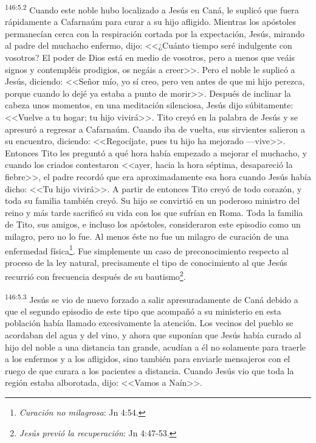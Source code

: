\par 
\textsuperscript{146:5.2} Cuando este noble hubo localizado a Jesús en Caná, le suplicó que fuera rápidamente a Cafarnaúm para curar a su hijo afligido. Mientras los apóstoles permanecían cerca con la respiración cortada por la expectación, Jesús, mirando al padre del muchacho enfermo, dijo: <<¿Cuánto tiempo seré indulgente con vosotros? El poder de Dios está en medio de vosotros, pero a menos que veáis signos y contempléis prodigios, os negáis a creer>>. Pero el noble le suplicó a Jesús, diciendo: <<Señor mío, yo sí creo, pero ven antes de que mi hijo perezca, porque cuando lo dejé ya estaba a punto de morir>>. Después de inclinar la cabeza unos momentos, en una meditación silenciosa, Jesús dijo súbitamente: <<Vuelve a tu hogar; tu hijo vivirá>>. Tito creyó en la palabra de Jesús y se apresuró a regresar a Cafarnaúm. Cuando iba de vuelta, sus sirvientes salieron a su encuentro, diciendo: <<Regocíjate, pues tu hijo ha mejorado ---vive>>. Entonces Tito les preguntó a qué hora había empezado a mejorar el muchacho, y cuando los criados contestaron <<ayer, hacia la hora séptima, desapareció la fiebre>>, el padre recordó que era aproximadamente esa hora cuando Jesús había dicho: <<Tu hijo vivirá>>. A partir de entonces Tito creyó de todo corazón, y toda su familia también creyó. Su hijo se convirtió en un poderoso ministro del reino y más tarde sacrificó su vida con los que sufrían en Roma. Toda la familia de Tito, sus amigos, e incluso los apóstoles, consideraron este episodio como un milagro, pero no lo fue. Al menos éste no fue un milagro de curación de una enfermedad física\footnote{\textit{Curación no milagrosa}: Jn 4:54.}. Fue simplemente un caso de preconocimiento respecto al proceso de la ley natural, precisamente el tipo de conocimiento al que Jesús recurrió con frecuencia después de su bautismo\footnote{\textit{Jesús previó la recuperación}: Jn 4:47-53.}.

\par 
\textsuperscript{146:5.3} Jesús se vio de nuevo forzado a salir apresuradamente de Caná debido a que el segundo episodio de este tipo que acompañó a su ministerio en esta población había llamado excesivamente la atención. Los vecinos del pueblo se acordaban del agua y del vino, y ahora que suponían que Jesús había curado al hijo del noble a una distancia tan grande, acudían a él no solamente para traerle a los enfermos y a los afligidos, sino también para enviarle mensajeros con el ruego de que curara a los pacientes a distancia. Cuando Jesús vio que toda la región estaba alborotada, dijo: <<Vamos a Naín>>.

